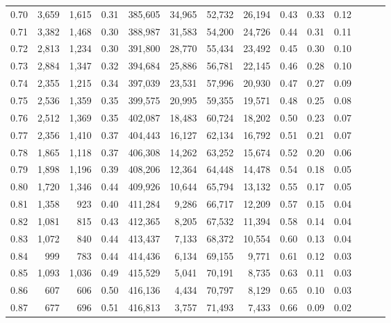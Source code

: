 \begin{tabular}{rrrrrrrrrrrrrr}
0.70 &   3,659 &  1,615 &  0.31 &  385,605 &   34,965 &  52,732 &  26,194 &  0.43 &  0.33 &      0.12 \\
0.71 &   3,382 &  1,468 &  0.30 &  388,987 &   31,583 &  54,200 &  24,726 &  0.44 &  0.31 &      0.11 \\
0.72 &   2,813 &  1,234 &  0.30 &  391,800 &   28,770 &  55,434 &  23,492 &  0.45 &  0.30 &      0.10 \\
0.73 &   2,884 &  1,347 &  0.32 &  394,684 &   25,886 &  56,781 &  22,145 &  0.46 &  0.28 &      0.10 \\
0.74 &   2,355 &  1,215 &  0.34 &  397,039 &   23,531 &  57,996 &  20,930 &  0.47 &  0.27 &      0.09 \\
0.75 &   2,536 &  1,359 &  0.35 &  399,575 &   20,995 &  59,355 &  19,571 &  0.48 &  0.25 &      0.08 \\
0.76 &   2,512 &  1,369 &  0.35 &  402,087 &   18,483 &  60,724 &  18,202 &  0.50 &  0.23 &      0.07 \\
0.77 &   2,356 &  1,410 &  0.37 &  404,443 &   16,127 &  62,134 &  16,792 &  0.51 &  0.21 &      0.07 \\
0.78 &   1,865 &  1,118 &  0.37 &  406,308 &   14,262 &  63,252 &  15,674 &  0.52 &  0.20 &      0.06 \\
0.79 &   1,898 &  1,196 &  0.39 &  408,206 &   12,364 &  64,448 &  14,478 &  0.54 &  0.18 &      0.05 \\
0.80 &   1,720 &  1,346 &  0.44 &  409,926 &   10,644 &  65,794 &  13,132 &  0.55 &  0.17 &      0.05 \\
0.81 &   1,358 &    923 &  0.40 &  411,284 &    9,286 &  66,717 &  12,209 &  0.57 &  0.15 &      0.04 \\
0.82 &   1,081 &    815 &  0.43 &  412,365 &    8,205 &  67,532 &  11,394 &  0.58 &  0.14 &      0.04 \\
0.83 &   1,072 &    840 &  0.44 &  413,437 &    7,133 &  68,372 &  10,554 &  0.60 &  0.13 &      0.04 \\
0.84 &     999 &    783 &  0.44 &  414,436 &    6,134 &  69,155 &   9,771 &  0.61 &  0.12 &      0.03 \\
0.85 &   1,093 &  1,036 &  0.49 &  415,529 &    5,041 &  70,191 &   8,735 &  0.63 &  0.11 &      0.03 \\
0.86 &     607 &    606 &  0.50 &  416,136 &    4,434 &  70,797 &   8,129 &  0.65 &  0.10 &      0.03 \\
0.87 &     677 &    696 &  0.51 &  416,813 &    3,757 &  71,493 &   7,433 &  0.66 &  0.09 &      0.02 \\

\end{tabular}
